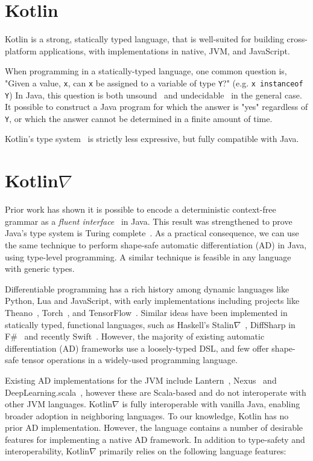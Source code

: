 \documentclass[12pt,initial,twoside,maitrise]{dms}
\numberwithin{equation}{section}
\numberwithin{table}{chapter}
\numberwithin{figure}{chapter}
\begin{document}
\section{Kotlin}\label{sec:kotlin}

Kotlin is a strong, statically typed language, that is well-suited for building cross-platform applications, with implementations in native, JVM, and JavaScript.

When programming in a statically-typed language, one common question is, "Given a value, \texttt{x}, can \texttt{x} be assigned to a variable of type \texttt{Y}?" (e.g. \texttt{x instanceof Y}) In Java, this question is both unsound~\cite{amin2016java} and undecidable~\cite{Grigore:2017:JGT:3009837.3009871} in the general case. It possible to construct a Java program for which the answer is "yes" regardless of \texttt{Y}, or which the answer cannot be determined in a finite amount of time.

Kotlin's type system~\cite{tate2013mixed} is strictly less expressive, but fully compatible with Java.

\section{Kotlin$\nabla$}\label{sec:kotlingrad}

Prior work has shown it is possible to encode a deterministic context-free grammar as a \textit{fluent interface}~\cite{gil2016formal} in Java. This result was strengthened to prove Java's type system is Turing complete~\cite{Grigore:2017:JGT:3009837.3009871}. As a practical consequence, we can use the same technique to perform shape-safe automatic differentiation (AD) in Java, using type-level programming. A similar technique is feasible in any language with generic types.

Differentiable programming has a rich history among dynamic languages like Python, Lua and JavaScript, with early implementations including projects like Theano~\cite{theano}, Torch~\cite{collobert2002torch}, and TensorFlow~\cite{abadi2016tensorflow}. Similar ideas have been implemented in statically typed, functional languages, such as Haskell's Stalin$\nabla$~\cite{pearlmutter2008using}, DiffSharp in F\#~\cite{baydin-diffsharp} and recently Swift~\cite{swift}. However, the majority of existing automatic differentiation (AD) frameworks use a loosely-typed DSL, and few offer shape-safe tensor operations in a widely-used programming language.

Existing AD implementations for the JVM include Lantern~\cite{DBLP:journals-corr-abs-1803-10228}, Nexus~\cite{chen2017typesafe} and DeepLearning.scala~\cite{dl4s}, however these are Scala-based and do not interoperate with other JVM languages. Kotlin$\nabla$ is fully interoperable with vanilla Java, enabling broader adoption in neighboring languages. To our knowledge, Kotlin has no prior AD implementation. However, the language contains a number of desirable features for implementing a native AD framework. In addition to type-safety and interoperability, Kotlin$\nabla$ primarily relies on the following language features:
\end{document}
